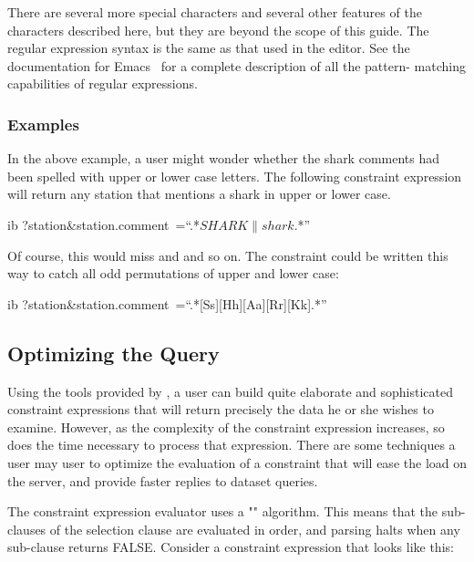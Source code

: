 There are several more special characters and several other features
of the characters described here, but they are beyond the scope of
this guide. The \opendap regular expression syntax is the same as that
used in the  editor. See the documentation for
Emacs~ for a complete description of all the pattern-
matching capabilities of regular expressions.

\subsubsection{Examples}

In the above example, a user might wonder whether the shark comments
had been spelled with upper or lower case letters. The following
constraint expression will return any station that mentions a shark in
upper or lower case.

\begin{vcode}{ib}
?station&station.comment~=``.*\(SHARK\|shark\).*''
\end{vcode}

Of course, this would miss  and  and so on. The
constraint could be written this way to catch all odd permutations of
upper and lower case:

\begin{vcode}{ib}
?station&station.comment~=``.*[Ss][Hh][Aa][Rr][Kk].*''
\end{vcode}

\subsection{Optimizing the Query}

  
 
Using the tools provided by \opendap, a user can build quite elaborate and
sophisticated constraint expressions that will return precisely the
data he or she wishes to examine. However, as the complexity of the
constraint expression increases, so does the time necessary to process
that expression. There are some techniques a user may user to optimize
the evaluation of a constraint that will ease the load on the server,
and provide faster replies to \opendap dataset queries.

The \opendap constraint expression evaluator uses a "" algorithm.  This means that the
sub-clauses of the selection clause are evaluated in order, and
parsing halts when any sub-clause returns FALSE. Consider a constraint
expression that looks like this:   


